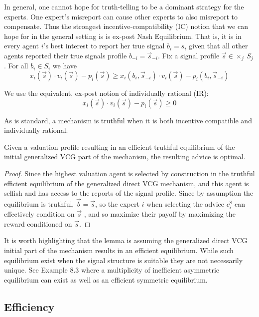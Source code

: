 In general, one cannot hope for truth-telling to be a dominant strategy for the experts. One expert's misreport can cause other experts to also misreport to compensate. Thus the strongest incentive-compatibility (IC) notion that we can hope for in the general setting is is ex-post Nash Equilibrium. That is, it is in every agent $i$'s best interest to report her true signal $b_i = s_i$ given that all other agents reported their true signals profile $b_{-i} = \vec{s}_{-i}$. Fix a signal profile $\vec{s} \in \times _{j} \  S_j$. For all $b_i \in S_i$ we have $$
x_i(\vec{s}) \cdot v_i(\vec{s}) - p_i(\vec{s}) \geq
x_i(b_i, \vec{s}_{-i}) \cdot v_i(\vec{s}) - p_i(b_i, \vec{s}_{-i})
$$

We use the equivalent, ex-post notion of individually rational (IR): 
$$
x_i(\vec{s}) \cdot v_i(\vec{s}) - p_i(\vec{s}) \geq 0
$$

As is standard, a mechanism is truthful when it is both incentive compatible and individually rational.

\begin{lem}\label{lem:efficient_pass}
Given a valuation profile resulting in an efficient truthful equilibrium of the initial generalized VCG part of the mechanism, the resulting advice is optimal.
\end{lem}

\begin{proof}
Since the highest valuation agent is selected by construction in the truthful efficient equilibrium of the generalized direct VCG mechanism, and this agent is selfish and has access to the reports of the signal profile. 
Since by assumption the equilibrium is truthful, $\vec{b} = \vec{s}$, so the expert $i$ when selecting the advice $c^8_i$ can effectively condition on $\vec{s}$ , and so maximize their payoff  by maximizing the reward conditioned on  $\vec{s}$.
\end{proof}


It is worth highlighting that the lemma is assuming the generalized direct VCG initial part of the mechanism results in an efficient equilibrium. While such equilibrium exist when the signal structure is suitable they are not necessarily unique. See \citet{krishna2009auction} Example 8.3 where a multiplicity of inefficient asymmetric equilibrium  can exist as well as an efficient symmetric equilibrium. 


\subsection{Efficiency}

